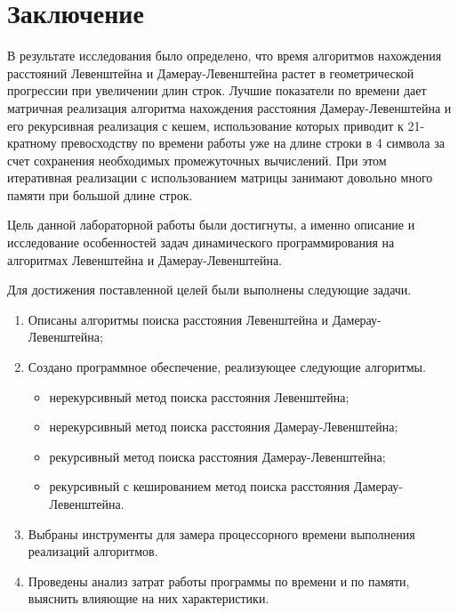 \chapter*{Заключение}

В результате исследования было определено, что время алгоритмов нахождения расстояний Левенштейна и Дамерау-Левенштейна растет в геометрической прогрессии при увеличении длин строк. Лучшие показатели по времени дает матричная реализация алгоритма нахождения расстояния Дамерау-Левенштейна и его рекурсивная реализация с кешем, использование которых приводит к 21-кратному превосходству по времени работы уже на длине строки в 4 символа за счет сохранения необходимых промежуточных вычислений. При этом итеративная реализации с использованием матрицы занимают довольно много памяти при большой длине строк. 

Цель данной лабораторной работы были достигнуты, а именно описание и исследование особенностей задач динамического программирования на алгоритмах Левенштейна и Дамерау-Левенштейна.

Для достижения поставленной целей были выполнены следующие задачи.
\begin{enumerate}[label={\arabic*)}]
	\item Описаны алгоритмы поиска расстояния Левенштейна и \newline Дамерау-Левенштейна;
	\item Создано программное обеспечение, реализующее следующие алгоритмы.
	\begin{itemize}[label=---]
		\item нерекурсивный метод поиска расстояния Левенштейна;
		\item нерекурсивный метод поиска расстояния Дамерау-Левенштейна;
		\item рекурсивный метод поиска расстояния Дамерау-Левенштейна;
		\item рекурсивный с кешированием метод поиска расстояния Дамерау-Левенштейна.
	\end{itemize}
	\item Выбраны инструменты для замера процессорного времени выполнения реализаций алгоритмов.
	\item Проведены анализ затрат работы программы по времени и по памяти, выяснить влияющие на них характеристики. 
\end{enumerate}
